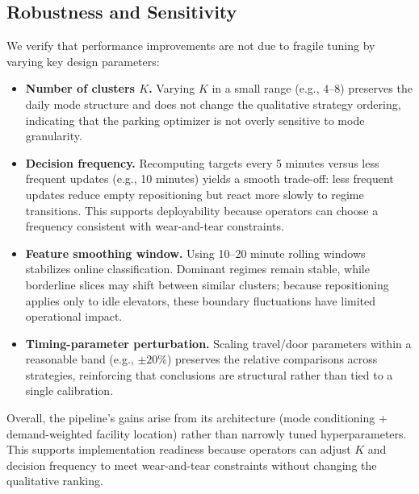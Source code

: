 \subsection{Robustness and Sensitivity}

We verify that performance improvements are not due to fragile tuning by varying key design parameters:
\begin{itemize}[leftmargin=1.2em,itemsep=0.25em,topsep=0.25em]
  \item \textbf{Number of clusters $K$.} Varying $K$ in a small range (e.g., $4$--$8$) preserves the daily mode structure and does not change the qualitative strategy ordering, indicating that the parking optimizer is not overly sensitive to mode granularity.
  \item \textbf{Decision frequency.} Recomputing targets every 5 minutes versus less frequent updates (e.g., 10 minutes) yields a smooth trade-off: less frequent updates reduce empty repositioning but react more slowly to regime transitions. This supports deployability because operators can choose a frequency consistent with wear-and-tear constraints.
  \item \textbf{Feature smoothing window.} Using 10--20 minute rolling windows stabilizes online classification. Dominant regimes remain stable, while borderline slices may shift between similar clusters; because repositioning applies only to idle elevators, these boundary fluctuations have limited operational impact.
  \item \textbf{Timing-parameter perturbation.} Scaling travel/door parameters within a reasonable band (e.g., $\pm 20\%$) preserves the relative comparisons across strategies, reinforcing that conclusions are structural rather than tied to a single calibration.
\end{itemize}

Overall, the pipeline's gains arise from its architecture (mode conditioning + demand-weighted facility location) rather than narrowly tuned hyperparameters.
This supports implementation readiness because operators can adjust $K$ and decision frequency to meet wear-and-tear constraints without changing the qualitative ranking.
